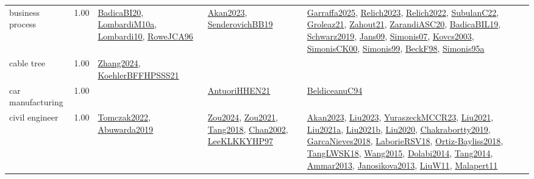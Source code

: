 {\begin{longtable}{p{3cm}r>{\raggedright\arraybackslash}p{6cm}>{\raggedright\arraybackslash}p{6cm}>{\raggedright\arraybackslash}p{8cm}}
\index{business process}\index{ApplicationAreas!business process}business process &  1.00 & \hyperref[detail:BadicaBI20]{BadicaBI20}, \hyperref[detail:LombardiM10a]{LombardiM10a}, \hyperref[detail:Lombardi10]{Lombardi10}, \hyperref[detail:RoweJCA96]{RoweJCA96} & \hyperref[detail:Akan2023]{Akan2023}, \hyperref[detail:SenderovichBB19]{SenderovichBB19} & \hyperref[detail:Garraffa2025]{Garraffa2025}, \hyperref[detail:Relich2023]{Relich2023}, \hyperref[detail:Relich2022]{Relich2022}, \hyperref[detail:SubulanC22]{SubulanC22}, \hyperref[detail:Groleaz21]{Groleaz21}, \hyperref[detail:Zahout21]{Zahout21}, \hyperref[detail:ZarandiASC20]{ZarandiASC20}, \hyperref[detail:BadicaBIL19]{BadicaBIL19}, \hyperref[detail:Schwarz2019]{Schwarz2019}, \hyperref[detail:Jans09]{Jans09}, \hyperref[detail:Simonis07]{Simonis07}, \hyperref[detail:Kovcs2003]{Kovcs2003}, \hyperref[detail:SimonisCK00]{SimonisCK00}, \hyperref[detail:Simonis99]{Simonis99}, \hyperref[detail:BeckF98]{BeckF98}, \hyperref[detail:Simonis95a]{Simonis95a}\\
\index{cable tree}\index{ApplicationAreas!cable tree}cable tree &  1.00 & \hyperref[detail:Zhang2024]{Zhang2024}, \hyperref[detail:KoehlerBFFHPSSS21]{KoehlerBFFHPSSS21} &  & \\
\index{car manufacturing}\index{ApplicationAreas!car manufacturing}car manufacturing &  1.00 &  & \hyperref[detail:AntuoriHHEN21]{AntuoriHHEN21} & \hyperref[detail:BeldiceanuC94]{BeldiceanuC94}\\
\index{civil engineer}\index{ApplicationAreas!civil engineer}civil engineer &  1.00 & \hyperref[detail:Tomczak2022]{Tomczak2022}, \hyperref[detail:Abuwarda2019]{Abuwarda2019} & \hyperref[detail:Zou2024]{Zou2024}, \hyperref[detail:Zou2021]{Zou2021}, \hyperref[detail:Tang2018]{Tang2018}, \hyperref[detail:Chan2002]{Chan2002}, \hyperref[detail:LeeKLKKYHP97]{LeeKLKKYHP97} & \hyperref[detail:Akan2023]{Akan2023}, \hyperref[detail:Liu2023]{Liu2023}, \hyperref[detail:YuraszeckMCCR23]{YuraszeckMCCR23}, \hyperref[detail:Liu2021]{Liu2021}, \hyperref[detail:Liu2021a]{Liu2021a}, \hyperref[detail:Liu2021b]{Liu2021b}, \hyperref[detail:Liu2020]{Liu2020}, \hyperref[detail:Chakrabortty2019]{Chakrabortty2019}, \hyperref[detail:GarcaNieves2018]{GarcaNieves2018}, \hyperref[detail:LaborieRSV18]{LaborieRSV18}, \hyperref[detail:Ortiz-Bayliss2018]{Ortiz-Bayliss2018}, \hyperref[detail:TangLWSK18]{TangLWSK18}, \hyperref[detail:Wang2015]{Wang2015}, \hyperref[detail:Dolabi2014]{Dolabi2014}, \hyperref[detail:Tang2014]{Tang2014}, \hyperref[detail:Ammar2013]{Ammar2013}, \hyperref[detail:Janosikova2013]{Janosikova2013}, \hyperref[detail:LiuW11]{LiuW11}, \hyperref[detail:Malapert11]{Malapert11}\\

\end{longtable}}
